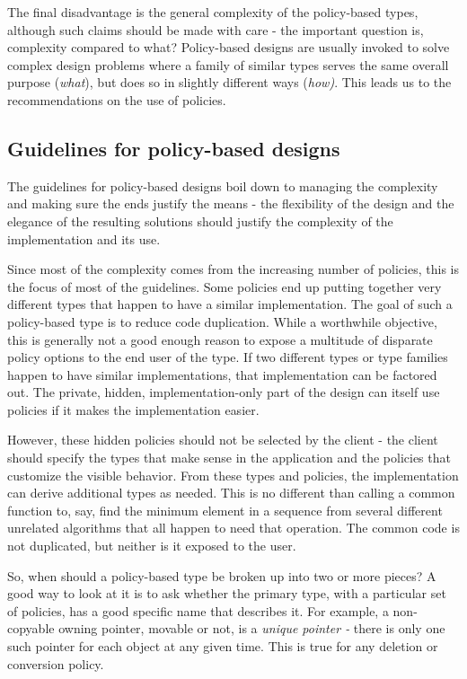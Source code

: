 The final disadvantage is the general complexity of the policy-based types, although such claims should be made with care - the important question is, complexity compared to what? Policy-based designs are usually invoked to solve complex design problems where a family of similar types serves the same overall purpose (\emph{what}), but does so in slightly different ways (\emph{how)}. This leads us to the recommendations on the use of policies.

\subsection{Guidelines for policy-based designs}

The guidelines for policy-based designs boil down to managing the complexity and making sure the ends justify the means - the flexibility of the design and the elegance of the resulting solutions should justify the complexity of the implementation and its use.

Since most of the complexity comes from the increasing number of policies, this is the focus of most of the guidelines. Some policies end up putting together very different types that happen to have a similar implementation. The goal of such a policy-based type is to reduce code duplication. While a worthwhile objective, this is generally not a good enough reason to expose a multitude of disparate policy options to the end user of the type. If two different types or type families happen to have similar implementations, that implementation can be factored out. The private, hidden, implementation-only part of the design can itself use policies if it makes the implementation easier.

However, these hidden policies should not be selected by the client - the client should specify the types that make sense in the application and the policies that customize the visible behavior. From these types and policies, the implementation can derive additional types as needed. This is no different than calling a common function to, say, find the minimum element in a sequence from several different unrelated algorithms that all happen to need that operation. The common code is not duplicated, but neither is it exposed to the user.

So, when should a policy-based type be broken up into two or more pieces? A good way to look at it is to ask whether the primary type, with a particular set of policies, has a good specific name that describes it. For example, a non-copyable owning pointer, movable or not, is a \emph{unique pointer -} there is only one such pointer for each object at any given time. This is true for any deletion or conversion policy.

